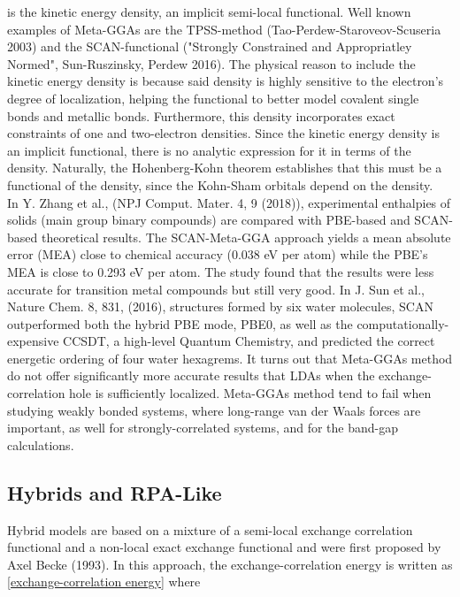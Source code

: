 \documentclass{homework}
\begin{document}
is the kinetic energy density, an implicit semi-local functional. Well known examples of Meta-GGAs are the TPSS-method (Tao-Perdew-Staroveov-Scuseria 2003) and the SCAN-functional ("Strongly Constrained and Appropriatley Normed", Sun-Ruszinsky, Perdew 2016). The physical reason to include the kinetic energy density is because said density is highly sensitive to the electron's degree of localization, helping the functional to better model covalent single bonds and metallic bonds. Furthermore, this density incorporates exact constraints of one and two-electron densities. Since the kinetic energy density is an implicit functional, there is no analytic expression for it in terms of the density. Naturally, the Hohenberg-Kohn theorem establishes that this must be a functional of the density, since the Kohn-Sham orbitals depend on the density. \\

In Y. Zhang et al., (NPJ Comput. Mater. 4, 9 (2018)), experimental enthalpies of solids (main group binary compounds) are compared with PBE-based and SCAN-based theoretical results. The SCAN-Meta-GGA approach yields a mean absolute error (MEA) close to chemical accuracy (0.038 eV per atom) while the PBE's MEA is close to 0.293 eV per atom. The study found that the results were less accurate for transition metal compounds but still very good. In J. Sun et al., Nature Chem. 8, 831, (2016), structures formed by six water molecules, SCAN outperformed both the hybrid PBE mode, PBE0, as well as the computationally-expensive CCSDT, a high-level Quantum Chemistry, and predicted the correct energetic ordering of four water hexagrems. It turns out that Meta-GGAs method do not offer significantly more accurate results that LDAs when the exchange-correlation hole is sufficiently localized. Meta-GGAs method tend to fail when studying weakly bonded systems, where long-range van der Waals forces are important, as well for strongly-correlated systems, and for the band-gap calculations. \\

\subsection{Hybrids and RPA-Like}

Hybrid models are based on a mixture of a semi-local exchange correlation functional and a non-local exact exchange functional and were first proposed by Axel Becke (1993). In this approach, the exchange-correlation energy is written as \eqref{exchange-correlation energy} where 
\end{document}
